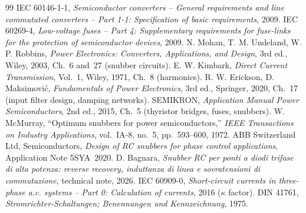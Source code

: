 \documentclass[10pt,a4paper]{scrartcl}
\begin{document}
\begin{thebibliography}{99}\small
{} IEC 60146-1-1, \emph{Semiconductor converters -- General requirements and line commutated converters -- Part 1-1: Specification of basic requirements}, 2009.
 IEC 60269-4, \emph{Low-voltage fuses -- Part 4: Supplementary requirements for fuse-links for the protection of semiconductor devices}, 2009.
 N. Mohan, T. M. Undeland, W. P. Robbins, \emph{Power Electronics: Converters, Applications, and Design}, 3rd ed., Wiley, 2003, Ch.~6 and~27 (snubber circuits).
 E. W. Kimbark, \emph{Direct Current Transmission}, Vol.~1, Wiley, 1971, Ch.~8 (harmonics).
 R. W. Erickson, D. Maksimovi\'c, \emph{Fundamentals of Power Electronics}, 3rd ed., Springer, 2020, Ch.~17 (input filter design, damping networks).
 SEMIKRON, \emph{Application Manual Power Semiconductors}, 2nd ed., 2015, Ch.~5 (thyristor bridges, fuses, snubbers).
 W. McMurray, ``Optimum snubbers for power semiconductors,'' \emph{IEEE Transactions on Industry Applications}, vol.~IA-8, no.~5, pp.~593--600, 1972.
 ABB Switzerland Ltd, Semiconductors, \emph{Design of RC snubbers for phase control applications}, Application Note 5SYA~2020.
 D. Bagnara, \emph{Snubber RC per ponti a diodi trifase di alta potenza: reverse recovery, induttanza di linea e sovratensioni di commutazione}, technical note, 2026.
 IEC 60909-0, \emph{Short-circuit currents in three-phase a.c. systems -- Part 0: Calculation of currents}, 2016 ($\kappa$ factor).
 DIN 41761, \emph{Stromrichter-Schaltungen; Benennungen und Kennzeichnung}, 1975.
\end{thebibliography}
\end{document}
